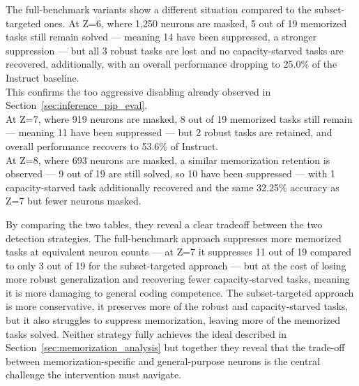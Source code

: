 \documentclass[mscthesis]{usiinfthesis}
\begin{document}
The full-benchmark variants show a different situation compared to the subset-targeted ones.
At Z=6, where 1,250 neurons are masked, 5 out of 19 memorized tasks still remain solved --- meaning 14
have been suppressed, a stronger suppression --- but all 3 robust tasks are lost and no capacity-starved tasks are recovered,
additionally, with an overall performance dropping to 25.0\% of the Instruct baseline. \\
This confirms the too aggressive disabling already observed in Section~\ref{sec:inference_pip_eval}. \\
At Z=7, where 919 neurons are masked, 8 out of 19 memorized tasks still remain --- meaning 11 have been suppressed --- but 2 robust tasks are
retained, and overall performance recovers to 53.6\% of Instruct. \\ 
At Z=8, where 693 neurons are masked, a similar memorization retention is observed ---  9 out of 19 are still solved, so 10 have been suppressed --- with 1
capacity-starved task additionally recovered and the same 32.25\% accuracy as Z=7 but fewer neurons masked.
\par\vspace{1em}
By comparing the two tables, they reveal a clear tradeoff between the two detection strategies.
The full-benchmark approach suppresses more memorized tasks at equivalent neuron counts
--- at Z=7 it suppresses 11 out of 19 compared to only 3 out of 19 for the
subset-targeted approach --- but at the cost of losing more robust generalization and recovering fewer capacity-starved tasks, meaning it is more damaging to general coding competence.
The subset-targeted approach is more conservative, it preserves more of the robust and capacity-starved tasks, but it also struggles to suppress memorization, leaving more of the memorized tasks solved.
Neither strategy fully achieves the ideal described in Section~\ref{sec:memorization_analysis}  but together they reveal that the trade-off between
memorization-specific and general-purpose neurons is the central challenge the intervention must navigate.
\end{document}
